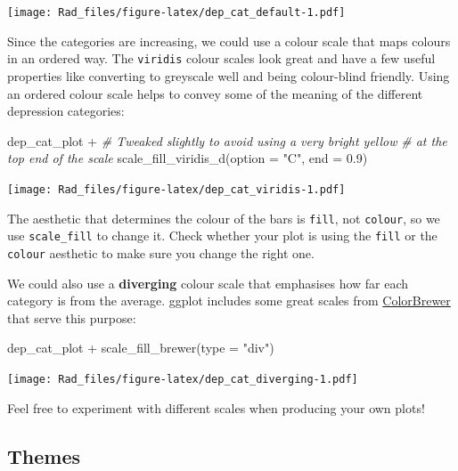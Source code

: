 \documentclass[
]{book}
\newenvironment{Shaded}{\begin{snugshade}}{\end{snugshade}}
\newcommand{\AttributeTok}[1]{\textcolor[rgb]{0.77,0.63,0.00}{#1}}
\newcommand{\CommentTok}[1]{\textcolor[rgb]{0.56,0.35,0.01}{\textit{#1}}}
\newcommand{\FloatTok}[1]{\textcolor[rgb]{0.00,0.00,0.81}{#1}}
\newcommand{\FunctionTok}[1]{\textcolor[rgb]{0.00,0.00,0.00}{#1}}
\newcommand{\NormalTok}[1]{#1}
\newcommand{\SpecialCharTok}[1]{\textcolor[rgb]{0.00,0.00,0.00}{#1}}
\newcommand{\StringTok}[1]{\textcolor[rgb]{0.31,0.60,0.02}{#1}}
\begin{document}
\texttt{[image: Rad\_files/figure-latex/dep\_cat\_default-1.pdf]}

Since the categories are increasing, we could use a colour scale
that maps colours in an ordered way. The \texttt{viridis} colour scales
look great and have a few useful properties like converting to
greyscale well and being colour-blind friendly. Using an ordered
colour scale helps to convey some of the meaning of the different
depression categories:

\begin{Shaded}
\begin{Highlighting}[]
\NormalTok{dep\_cat\_plot }\SpecialCharTok{+} 
    \CommentTok{\# Tweaked slightly to avoid using a very bright yellow}
    \CommentTok{\#   at the top end of the scale}
    \FunctionTok{scale\_fill\_viridis\_d}\NormalTok{(}\AttributeTok{option =} \StringTok{"C"}\NormalTok{, }\AttributeTok{end =} \FloatTok{0.9}\NormalTok{)}
\end{Highlighting}
\end{Shaded}

\texttt{[image: Rad\_files/figure-latex/dep\_cat\_viridis-1.pdf]}

\begin{note}
The aesthetic that determines the colour of the bars is \texttt{fill},
not \texttt{colour}, so we use \texttt{scale\_fill} to change it. Check
whether your plot is using the \texttt{fill} or the \texttt{colour}
aesthetic to make sure you change the right one.
\end{note}

We could also use a \textbf{diverging} colour scale that emphasises
how far each category is from the average. ggplot includes
some great scales from \href{http://colorbrewer2.org/}{ColorBrewer} that
serve this purpose:

\begin{Shaded}
\begin{Highlighting}[]
\NormalTok{dep\_cat\_plot }\SpecialCharTok{+} 
    \FunctionTok{scale\_fill\_brewer}\NormalTok{(}\AttributeTok{type =} \StringTok{"div"}\NormalTok{)}
\end{Highlighting}
\end{Shaded}

\texttt{[image: Rad\_files/figure-latex/dep\_cat\_diverging-1.pdf]}

Feel free to experiment with different scales when producing
your own plots!

\hypertarget{themes}{%
\subsection{Themes}\label{themes}}
\end{document}
